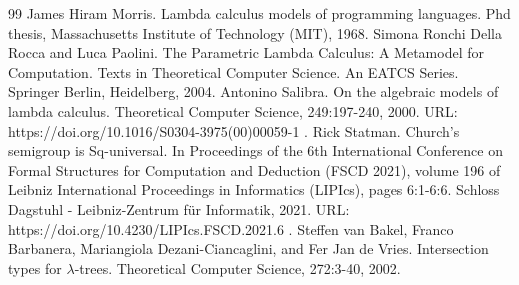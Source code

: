\documentclass[10pt,a4paper]{amsart}
\begin{document}
\begin{thebibliography}{99}
 James Hiram Morris. Lambda calculus models of programming languages. Phd thesis, Massachusetts Institute of Technology (MIT), 1968.
 Simona Ronchi Della Rocca and Luca Paolini. The Parametric Lambda Calculus: A Metamodel for Computation. Texts in Theoretical Computer Science. An EATCS Series. Springer Berlin, Heidelberg, 2004.
 Antonino Salibra. On the algebraic models of lambda calculus. Theoretical Computer Science, 249:197-240, 2000. URL: https://doi.org/10.1016/S0304-3975(00)00059-1 .
 Rick Statman. Church’s semigroup is Sq-universal. In Proceedings of the 6th International Conference on Formal Structures for Computation and Deduction (FSCD 2021), volume 196 of Leibniz International Proceedings in Informatics (LIPIcs), pages 6:1-6:6. Schloss Dagstuhl - Leibniz-Zentrum für Informatik, 2021. URL: https://doi.org/10.4230/LIPIcs.FSCD.2021.6 .
 Steffen van Bakel, Franco Barbanera, Mariangiola Dezani-Ciancaglini, and Fer Jan de Vries. Intersection types for \ensuremath{\lambda}-trees. Theoretical Computer Science, 272:3-40, 2002.
\end{thebibliography}
\end{document}

